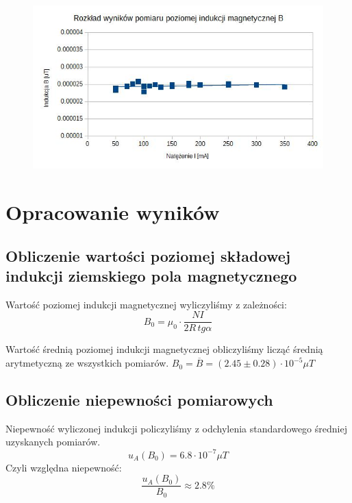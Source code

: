 \documentclass{article}
\begin{document}
\begin{figure}[h!]
\centering
\includegraphics[scale=0.53]{ch01}
\end{figure}



\section{Opracowanie wyników}
\subsection{Obliczenie wartości poziomej składowej indukcji ziemskiego pola magnetycznego}

Wartość poziomej indukcji magnetycznej wyliczyliśmy z zależności:
\begin{equation}
B_0 = \mu_0 \cdot \frac{NI}{2R \, tg \alpha}
\end{equation}

Wartość średnią poziomej indukcji magnetycznej obliczyliśmy licząć średnią arytmetyczną ze wszystkich pomiarów.
$B_0 = \overline{B} = (2.45 \pm 0.28) \cdot 10^{-5} \mu T$
\newline
\subsection{Obliczenie niepewności pomiarowych}
Niepewność wyliczonej indukcji policzyliśmy z odchylenia standardowego średniej uzyskanych pomiarów.
\begin{equation}
u_A(B_0) = 6.8 \cdot 10^{-7} \mu T
\end{equation}
Czyli względna niepewność:
\begin{equation}
\frac{u_A(B_0)}{B_0} \approx 2.8\%
\end{equation}
\end{document}
